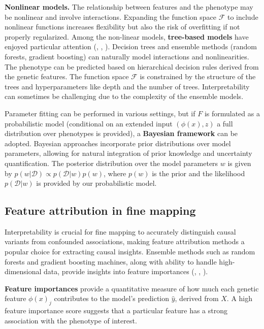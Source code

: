 \documentclass[12pt]{article}
\begin{document}
\textbf{Nonlinear models.} The relationship between features and the phenotype may be nonlinear and involve interactions. Expanding the function space $\mathcal{F}$ to include nonlinear functions increases flexibility but also the risk of overfitting if not properly regularized. Among the non-linear models, \textbf{tree-based models} have enjoyed particular attention (\cite{karanth2022exploring}, \cite{allen2021forest}, \cite{batisti2024optimising}). Decision trees and ensemble methods (random forests, gradient boosting) can naturally model interactions and nonlinearities. The phenotype can be predicted based on hierarchical decision rules derived from the genetic features. The function space $\mathcal{F}$ is constrained by the structure of the trees and hyperparameters like depth and the number of trees. Interpretability can sometimes be challenging due to the complexity of the ensemble models.

Parameter fitting can be performed in various settings, but if $F$ is formulated as a probabilistic model (conditional on an extended input $(\phi(x),z)$ a full distribution over phenotypes is provided), a \textbf{Bayesian framework} can be adopted. Bayesian approaches incorporate prior distributions over model parameters, allowing for natural integration of prior knowledge and uncertainty quantification. The posterior distribution over the model parameters $w$ is given by $p(w|\mathcal{D}) \propto p(\mathcal{D}|w)p(w)$, where $p(w)$ is the prior and the likelihood $p(\mathcal{D}|w)$ is provided by our probabilistic model. 


\subsection{Feature attribution in fine mapping}

Interpretability is crucial for fine mapping to accurately distinguish causal variants from confounded associations, making feature attribution methods a popular choice for extracting causal insights. Ensemble methods such as random forests and gradient boosting machines, along with ability to handle high-dimensional data, provide insights into feature importances (\cite{buckley2021lessons}, \cite{rahman2018machine}, \cite{wassan2018paam}). 

\textbf{Feature importances} provide a quantitative measure of how much each genetic feature $\phi(x)_j$ contributes to the model's prediction $\hat{y}$, derived from $X$. A high feature importance score suggests that a particular feature has a strong association with the phenotype of interest.  
\end{document}
